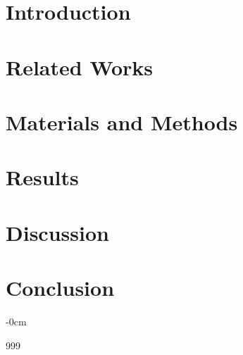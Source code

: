 \documentclass[journal,article,submit,pdftex,moreauthors]{Definitions/mdpi}
\begin{document}
\setcounter{section}{0}
\section{Introduction}
\label{sec:introduction}



\section{Related Works}
\label{sec:related_works}


\section{Materials and Methods}
\label{sec:materials_methods}


\section{Results}
\label{sec:results}


\section{Discussion}
\label{sec:discussion}


\section{Conclusion}
\label{sec:conclusion}


\begin{adjustwidth}{-\extralength}{0cm}



\begin{thebibliography}{999}

\end{thebibliography}


\PublishersNote{}
\end{adjustwidth}
\end{document}
